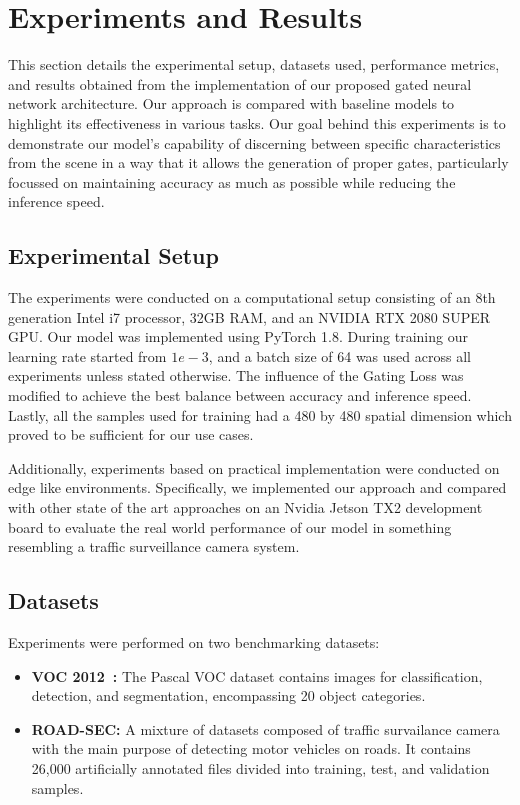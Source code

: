 \section{Experiments and Results}  

This section details the experimental setup, datasets used, performance metrics, and results obtained from the implementation of our proposed gated neural network architecture. Our approach is compared with baseline models to highlight its effectiveness in various tasks. Our goal behind this experiments is to demonstrate our model's capability of discerning between specific characteristics from the scene in a way that it allows the generation of proper gates, particularly focussed on maintaining accuracy as much as possible while reducing the inference speed.

\subsection{Experimental Setup}

The experiments were conducted on a computational setup consisting of an 8th generation Intel i7 processor, 32GB RAM, and an NVIDIA RTX 2080 SUPER GPU. Our model was implemented using PyTorch 1.8. During training our learning rate started from $1e-3$, and a batch size of 64 was used across all experiments unless stated otherwise. The influence of the Gating Loss was modified to achieve the best balance between accuracy and inference speed. Lastly, all the samples used for training had a 480 by 480 spatial dimension which proved to be sufficient for our use cases.

Additionally, experiments based on practical implementation were conducted on edge like environments. Specifically, we implemented our approach and compared with other state of the art approaches on an Nvidia Jetson TX2 development board to evaluate the real world performance of our model in something resembling a traffic surveillance camera system.

\subsection{Datasets}

Experiments were performed on two benchmarking datasets:
\begin{itemize}
    \item \textbf{VOC 2012~\cite{pascal-voc-2012}:} The Pascal VOC dataset contains images for classification, detection, and segmentation, encompassing 20 object categories.
    \item \textbf{ROAD-SEC:} A mixture of datasets composed of traffic survailance camera with the main purpose of detecting motor vehicles on roads. It contains 26,000 artificially annotated files divided into training, test, and validation samples.
\end{itemize}

